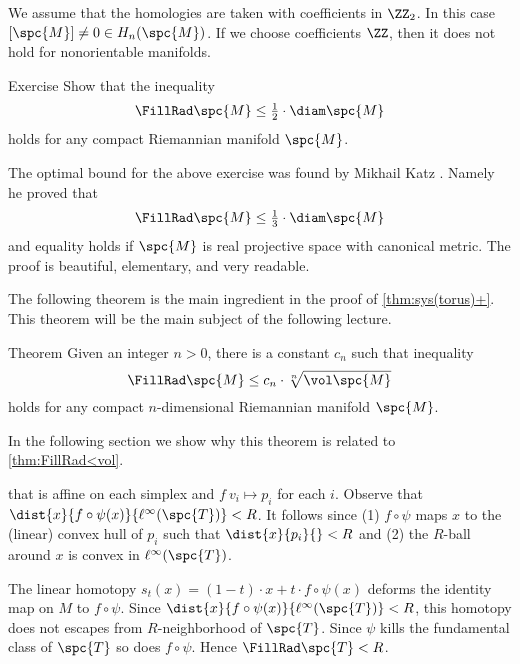 We assume that the homologies are taken with coefficients in $\ZZ_2$.
In this case $[\spc{M}]\ne0\in H_n(\spc{M})$.
If we choose coefficients $\ZZ$, then it does not hold for nonorientable manifolds.


\begin{thm}{Exercise}\label{ex:fillrad<diam/2}
Show that the inequality
\[\FillRad \spc{M}\le \tfrac12\cdot\diam \spc{M}\]
holds for any compact Riemannian manifold $\spc{M}$.
\end{thm}

The optimal bound for the above exercise was found by Mikhail Katz \cite{katz}.
Namely he proved that
\[\FillRad \spc{M}\le \tfrac13\cdot\diam \spc{M}\]
and equality holds if $\spc{M}$ is real projective space with canonical metric.
The proof is beautiful, elementary, and very readable.

\medskip

The following theorem is the main ingredient in the proof of \ref{thm:sys(torus)+}.
This theorem will be the main subject of the following lecture.

\begin{thm}{Theorem}\label{thm:FillRad<vol}
Given an integer $n>0$, there is a constant $c_n$ such that inequality
\[\FillRad \spc{M}\le c_n\cdot \sqrt[n]{\vol \spc{M}}\]
holds for any compact $n$-dimensional Riemannian manifold $\spc{M}$.
\end{thm}

In the following section we show why this theorem is related to \ref{thm:FillRad<vol}.





















that is affine on each simplex and $f\:v_i\mapsto p_i$ for each $i$.
Observe that $\dist{x}{f\circ\psi(x)}{\ell^\infty( \spc{T})}< R$.
It follows since (1) $f\circ\psi$ maps $x$ to the (linear) convex hull of $p_i$ such that $\dist{x}{p_i}{}<R$ and (2) the $R$-ball around $x$ is convex in $\ell^\infty( \spc{T})$.

The linear homotopy $s_t(x)=(1-t)\cdot x+t\cdot f\circ\psi(x)$ deforms the identity map on $M$ to $f\circ\psi$.
Since $\dist{x}{f\circ\psi(x)}{\ell^\infty( \spc{T})}< R$,
this homotopy does not escapes from $R$-neighborhood of $\spc{T}$.
Since $\psi$ kills the fundamental class of $\spc{T}$ so does $f\circ\psi$.
Hence $\FillRad \spc{T}<R$.


